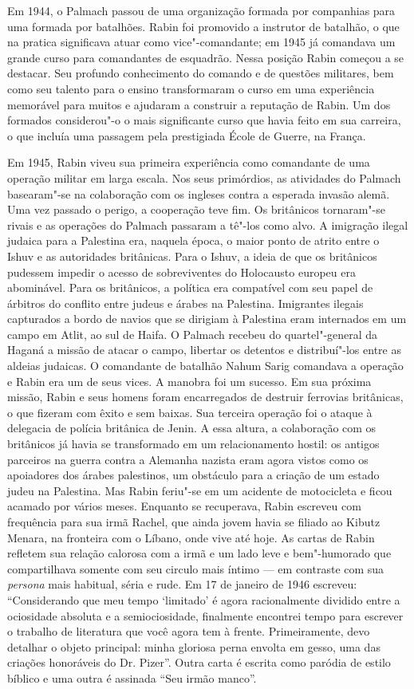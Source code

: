 Em 1944, o Palmach passou de uma organização formada por companhias para
uma formada por batalhões. Rabin foi promovido a instrutor de batalhão,
o que na pratica significava atuar como vice"-comandante;
em 1945 já comandava um grande curso para comandantes de esquadrão.
Nessa posição Rabin começou a se destacar. Seu profundo conhecimento do
comando e de questões militares, bem como seu talento para o ensino
transformaram o curso em uma experiência memorável para muitos e
ajudaram a construir a reputação de Rabin. Um dos formados considerou"-o
o mais significante curso que havia feito em sua carreira, o que incluía
uma passagem pela prestigiada École de Guerre, na França.

Em 1945, Rabin viveu sua primeira experiência como comandante de uma
operação militar em larga escala. Nos seus primórdios, as atividades do
Palmach basearam"-se na colaboração com os ingleses contra a esperada
invasão alemã. Uma vez passado o perigo, a cooperação teve fim. Os
britânicos tornaram"-se rivais e as operações
do Palmach passaram a tê"-los como alvo. A imigração ilegal judaica para
a Palestina era, naquela época, o maior ponto de atrito entre o Ishuv e
as autoridades britânicas. Para o Ishuv, a ideia de que os britânicos
pudessem impedir o acesso de sobreviventes do Holocausto europeu era
abominável. Para os britânicos, a política era compatível com seu papel
de árbitros do conflito entre judeus e árabes na Palestina. Imigrantes
ilegais capturados a bordo de navios que se dirigiam à Palestina eram
internados em um campo em Atlit, ao sul de Haifa. O Palmach recebeu do
quartel"-general da Haganá a missão de atacar o campo, libertar os
detentos e distribuí"-los entre as aldeias judaicas. O comandante de
batalhão Nahum Sarig comandava a operação e Rabin era um de seus vices.
A manobra foi um sucesso. Em sua próxima missão, Rabin e seus homens
foram encarregados de destruir ferrovias britânicas, o que fizeram com
êxito e sem baixas. Sua terceira operação foi o ataque à delegacia de
polícia britânica de Jenin. A essa altura, a colaboração com os
britânicos já havia se transformado em um relacionamento hostil: os
antigos parceiros na guerra contra a Alemanha nazista eram agora vistos
como os apoiadores dos árabes palestinos, um obstáculo para a criação
de um estado judeu na Palestina. Mas Rabin feriu"-se em um acidente de
motocicleta e ficou acamado por vários meses. Enquanto se recuperava,
Rabin escreveu com frequência para sua irmã Rachel, que ainda jovem
havia se filiado ao Kibutz Menara, na fronteira com o Líbano, onde vive
até hoje. As cartas de Rabin refletem sua relação calorosa com a irmã e
um lado leve e bem"-humorado que compartilhava somente com seu circulo
mais íntimo --- em contraste com sua \emph{persona} mais habitual, séria
e rude. Em 17 de janeiro de 1946 escreveu: ``Considerando que meu tempo
`limitado' é agora racionalmente dividido entre a ociosidade absoluta e
a semiociosidade, finalmente encontrei tempo para escrever o
trabalho de literatura que você agora tem à frente. Primeiramente, devo
detalhar o objeto principal: minha gloriosa perna envolta em gesso, uma
das criações honoráveis do Dr. Pizer''. Outra carta é escrita como
paródia de estilo bíblico e uma outra é assinada ``Seu irmão manco''.

